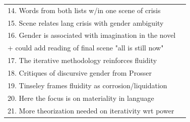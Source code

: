 \documentclass[11pt]{article}
\begin{document}
\begin{center}
\begin{tabular}{ll}
14. Words from both lists w/in one scene of crisis & \\[0pt]
15. Scene relates lang crisis with gender ambiguity & \\[0pt]
16. Gender is associated with imagination in the novel & \\[0pt]
+ could add reading of final scene "all is still now" & \\[0pt]
17. The iterative methodology reinforces fluidity & \\[0pt]
18. Critiques of discursive gender from Prosser & \\[0pt]
19. Tinseley frames fluidity as corrosion/liquidation & \\[0pt]
20. Here the focus is on materiality in language & \\[0pt]
21. More theorization needed on iterativity wrt power & \\[0pt]
\end{tabular}
\end{center}
\end{document}
